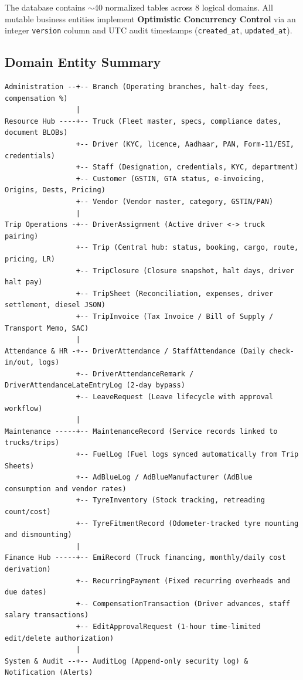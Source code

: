 \documentclass[11pt,a4paper]{article}
\begin{document}
The database contains $\sim$40 normalized tables across 8 logical domains. All mutable business entities implement \textbf{Optimistic Concurrency Control} via an integer \texttt{version} column and UTC audit timestamps (\texttt{created\_at}, \texttt{updated\_at}).

\subsection{Domain Entity Summary}
\begin{lstlisting}[style=asciiart]
Administration --+-- Branch (Operating branches, halt-day fees, compensation %)
                 |
Resource Hub ----+-- Truck (Fleet master, specs, compliance dates, document BLOBs)
                 +-- Driver (KYC, licence, Aadhaar, PAN, Form-11/ESI, credentials)
                 +-- Staff (Designation, credentials, KYC, department)
                 +-- Customer (GSTIN, GTA status, e-invoicing, Origins, Dests, Pricing)
                 +-- Vendor (Vendor master, category, GSTIN/PAN)
                 |
Trip Operations -+-- DriverAssignment (Active driver <-> truck pairing)
                 +-- Trip (Central hub: status, booking, cargo, route, pricing, LR)
                 +-- TripClosure (Closure snapshot, halt days, driver halt pay)
                 +-- TripSheet (Reconciliation, expenses, driver settlement, diesel JSON)
                 +-- TripInvoice (Tax Invoice / Bill of Supply / Transport Memo, SAC)
                 |
Attendance & HR -+-- DriverAttendance / StaffAttendance (Daily check-in/out, logs)
                 +-- DriverAttendanceRemark / DriverAttendanceLateEntryLog (2-day bypass)
                 +-- LeaveRequest (Leave lifecycle with approval workflow)
                 |
Maintenance -----+-- MaintenanceRecord (Service records linked to trucks/trips)
                 +-- FuelLog (Fuel logs synced automatically from Trip Sheets)
                 +-- AdBlueLog / AdBlueManufacturer (AdBlue consumption and vendor rates)
                 +-- TyreInventory (Stock tracking, retreading count/cost)
                 +-- TyreFitmentRecord (Odometer-tracked tyre mounting and dismounting)
                 |
Finance Hub -----+-- EmiRecord (Truck financing, monthly/daily cost derivation)
                 +-- RecurringPayment (Fixed recurring overheads and due dates)
                 +-- CompensationTransaction (Driver advances, staff salary transactions)
                 +-- EditApprovalRequest (1-hour time-limited edit/delete authorization)
                 |
System & Audit --+-- AuditLog (Append-only security log) & Notification (Alerts)
\end{lstlisting}
\end{document}
